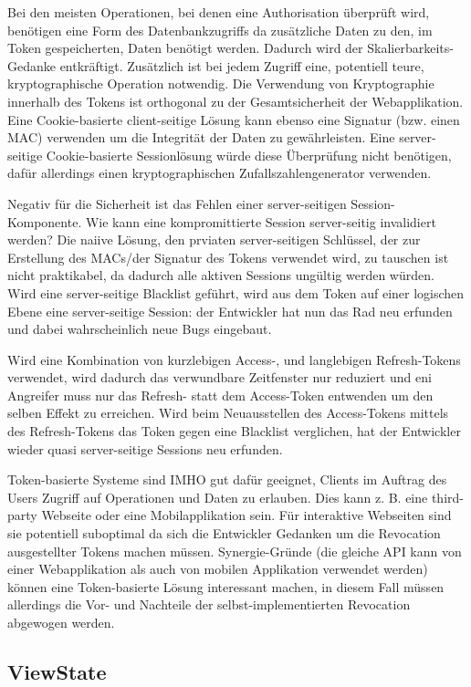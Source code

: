 Bei den meisten Operationen, bei denen eine Authorisation überprüft wird, benötigen eine Form des Datenbankzugriffs da zusätzliche Daten zu den, im Token gespeicherten, Daten benötigt werden. Dadurch wird der Skalierbarkeits-Gedanke entkräftigt. Zusätzlich ist bei jedem Zugriff eine, potentiell teure, kryptographische Operation notwendig. Die Verwendung von Kryptographie innerhalb des Tokens ist orthogonal zu der Gesamtsicherheit der Webapplikation. Eine Cookie-basierte client-seitige Lösung kann ebenso eine Signatur (bzw. einen MAC) verwenden um die Integrität der Daten zu gewährleisten. Eine server-seitige Cookie-basierte Sessionlösung würde diese Überprüfung nicht benötigen, dafür allerdings einen kryptographischen Zufallszahlengenerator verwenden.

Negativ für die Sicherheit ist das Fehlen einer server-seitigen Session-Komponente. Wie kann eine kompromittierte Session server-seitig invalidiert werden? Die naiive Lösung, den prviaten server-seitigen Schlüssel, der zur Erstellung des MACs/der Signatur des Tokens verwendet wird, zu tauschen ist nicht praktikabel, da dadurch alle aktiven Sessions ungültig werden würden. Wird eine server-seitige Blacklist geführt, wird aus dem Token auf einer logischen Ebene eine server-seitige Session: der Entwickler hat nun das Rad neu erfunden und dabei wahrscheinlich neue Bugs eingebaut.

Wird eine Kombination von kurzlebigen Access-, und langlebigen Refresh-Tokens verwendet, wird dadurch das verwundbare Zeitfenster nur reduziert und eni Angreifer muss nur das Refresh- statt dem Access-Token entwenden um den selben Effekt zu erreichen. Wird beim Neuausstellen des Access-Tokens mittels des Refresh-Tokens das Token gegen eine Blacklist verglichen, hat der Entwickler wieder quasi server-seitige Sessions neu erfunden.

Token-basierte Systeme sind IMHO gut dafür geeignet, Clients im Auftrag des Users Zugriff auf Operationen und Daten zu erlauben. Dies kann z. B. eine third-party Webseite oder eine Mobilapplikation sein. Für interaktive Webseiten sind sie potentiell suboptimal da sich die Entwickler Gedanken um die Revocation ausgestellter Tokens machen müssen. Synergie-Gründe (die gleiche API kann von einer Webapplikation als auch von mobilen Applikation verwendet werden) können eine Token-basierte Lösung interessant machen, in diesem Fall müssen allerdings die Vor- und Nachteile der selbst-implementierten Revocation abgewogen werden.

\subsection{ViewState}

